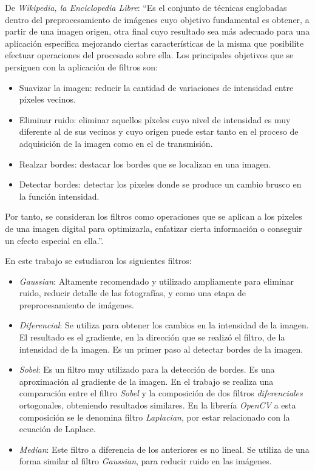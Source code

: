 \documentclass[10pt,a4paper]{article}
\begin{document}
De \textit{Wikipedia, la Enciclopedia Libre}: ``Es el conjunto de técnicas englobadas dentro del preprocesamiento de imágenes cuyo objetivo fundamental es obtener, a partir de una imagen origen, otra final cuyo resultado sea más adecuado para una aplicación específica mejorando ciertas características de la misma que posibilite efectuar operaciones del procesado sobre ella. Los principales objetivos que se persiguen con la aplicación de filtros son:
\begin{itemize}
\item Suavizar la imagen: reducir la cantidad de variaciones de intensidad entre píxeles vecinos.
\item Eliminar ruido: eliminar aquellos píxeles cuyo nivel de intensidad es muy diferente al de sus vecinos y cuyo origen puede estar tanto en el proceso de adquisición de la imagen como en el de transmisión.
\item Realzar bordes: destacar los bordes que se localizan en una imagen.
\item Detectar bordes: detectar los pixeles donde se produce un cambio brusco en la función intensidad.
\end{itemize}

Por tanto, se consideran los filtros como operaciones que se aplican a los pixeles de una imagen digital para optimizarla, enfatizar cierta información o conseguir un efecto especial en ella.''.

En este trabajo se estudiaron los siguientes filtros:
\begin{itemize}
\item \textit{Gaussian}: Altamente recomendado y utilizado ampliamente para eliminar ruido, reducir detalle de las fotografías, y como una etapa de preprocesamiento de imágenes.
\item \textit{Diferencial}: Se utiliza para obtener los cambios en la intensidad de la imagen. El resultado es el gradiente, en la dirección que se realizó el filtro, de la intensidad de la imagen. Es un primer paso al detectar bordes de la imagen.
\item \textit{Sobel}: Es un filtro muy utilizado para la detección de bordes. Es una aproximación al gradiente de la imagen. En el trabajo se realiza una comparación entre el filtro \textit{Sobel} y la composición de dos filtros \textit{diferenciales} ortogonales, obteniendo resultados similares. En la librería \textit{OpenCV} a esta composición se le denomina filtro \textit{Laplacian}, por estar relacionado con la ecuación de Laplace.
\item \textit{Median}: Este filtro a diferencia de los anteriores es no lineal. Se utiliza de una forma similar al filtro \textit{Gaussian}, para reducir ruido en las imágenes.
\end{itemize}
\end{document}
